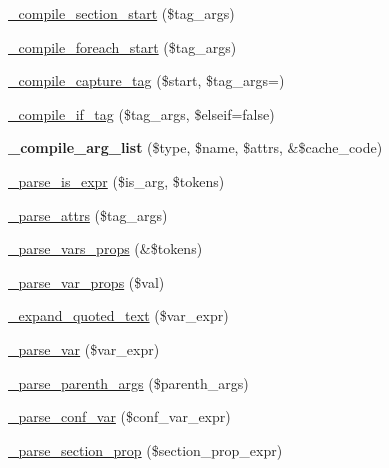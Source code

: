 \begin{DoxyCompactItemize}
\item 
\mbox{\hyperlink{class_smarty___compiler_ad6c4e3a2309e3354a84fbf2992e78832}{\+\_\+compile\+\_\+section\+\_\+start}} (\$tag\+\_\+args)
\item 
\mbox{\hyperlink{class_smarty___compiler_af4169d507c719a53677048d51f61090d}{\+\_\+compile\+\_\+foreach\+\_\+start}} (\$tag\+\_\+args)
\item 
\mbox{\hyperlink{class_smarty___compiler_aec50d967563cb6ed4faa78357735bf59}{\+\_\+compile\+\_\+capture\+\_\+tag}} (\$start, \$tag\+\_\+args=\textquotesingle{}\textquotesingle{})
\item 
\mbox{\hyperlink{class_smarty___compiler_a58d511ec4be2cdd98a9cd9576816fa21}{\+\_\+compile\+\_\+if\+\_\+tag}} (\$tag\+\_\+args, \$elseif=false)
\item 
\mbox{\label{class_smarty___compiler_aacb2bf6867e0434961e86130d8ee466e}} 
{\bfseries \+\_\+compile\+\_\+arg\+\_\+list} (\$type, \$name, \$attrs, \&\$cache\+\_\+code)
\item 
\mbox{\hyperlink{class_smarty___compiler_aaf4aec862e7a94d4217382dceae72b50}{\+\_\+parse\+\_\+is\+\_\+expr}} (\$is\+\_\+arg, \$tokens)
\item 
\mbox{\hyperlink{class_smarty___compiler_a5706e11e1bec434a07ced48e1462507c}{\+\_\+parse\+\_\+attrs}} (\$tag\+\_\+args)
\item 
\mbox{\hyperlink{class_smarty___compiler_a0e01da79d898117be860ab893d15b477}{\+\_\+parse\+\_\+vars\+\_\+props}} (\&\$tokens)
\item 
\mbox{\hyperlink{class_smarty___compiler_ac289c6c7cacaab608f81e68976acca77}{\+\_\+parse\+\_\+var\+\_\+props}} (\$val)
\item 
\mbox{\hyperlink{class_smarty___compiler_aba11f398aa3e57fbf119bb1d718e854c}{\+\_\+expand\+\_\+quoted\+\_\+text}} (\$var\+\_\+expr)
\item 
\mbox{\hyperlink{class_smarty___compiler_a2dcafc2754e3bdbda348d4b728d16a0e}{\+\_\+parse\+\_\+var}} (\$var\+\_\+expr)
\item 
\mbox{\hyperlink{class_smarty___compiler_aa33dedec468797a2311562fdd976c870}{\+\_\+parse\+\_\+parenth\+\_\+args}} (\$parenth\+\_\+args)
\item 
\mbox{\hyperlink{class_smarty___compiler_a5b6479977bec73b8ae0732c2b4f47d16}{\+\_\+parse\+\_\+conf\+\_\+var}} (\$conf\+\_\+var\+\_\+expr)
\item 
\mbox{\hyperlink{class_smarty___compiler_af3c3473a68eab6b7d9a08f7dd2357469}{\+\_\+parse\+\_\+section\+\_\+prop}} (\$section\+\_\+prop\+\_\+expr)

\end{DoxyCompactItemize}

